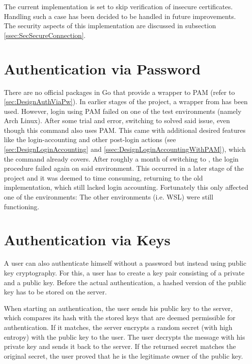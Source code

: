 \documentclass[10pt,a4paper,titlepage,twoside,english,final]{zhawreprt}
\begin{document}
The current implementation is set to skip verification of insecure certificates.
Handling such a case has been decided to be handled in future improvements.
The security aspects of this implementation are discussed in subsection \ref{ssec:SecSecureConnection}.

\section{Authentication via Password}\label{sec:ImplAuthViaPw}
There are no official packages in \gls{Go} that provide a wrapper to \gls{PAM} (refer to \ref{sec:DesignAuthViaPw}).
In earlier stages of the project, a wrapper from \cite{gopam} has been used.
However, \gls{login} using \gls{PAM} failed on one of the test environments (namely Arch \gls{Linux}).
After some trial and error, switching to \cite{login} solved said issue, even though this command also uses \gls{PAM}.
This came with additional desired features like the \gls{login}-accounting and other post-\gls{login} actions (see \ref{sec:DesignLoginAccounting} and \ref{ssec:DesignLoginAccountingWithPAM}), which the command already covers.
After roughly a month of switching to \cite{login}, the \gls{login} procedure failed again on said environment.
This occurred in a later stage of the project and it was deemed to time consuming, returning to the old implementation, which still lacked \gls{login} accounting.
Fortunately this only affected one of the environments:
The other environments (i.e. \gls{WSL}) were still functioning.

\section{Authentication via Keys}\label{sec:ImplAuthViaKeys}
A user can also authenticate himself without a password but instead using public key cryptography.
For this, a user has to create a key pair consisting of a private and a public key.
Before the actual authentication, a hashed version of the public key has to be stored on the server.

When starting an authentication, the user sends his public key to the server, which compares its hash with the stored keys that are deemed permissible for authentication.
If it matches, the server encrypts a random secret (with high entropy) with the public key to the user.
The user decrypts the message with his private key and sends it back to the server.
If the returned secret matches the original secret, the user proved that he is the legitimate owner of the public key.
\end{document}
